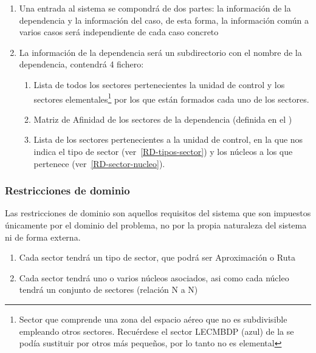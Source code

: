 \begin{enumerate}[label={\textbf{RIO\arabic*}}]
    \item  Una entrada al sistema se compondrá de dos partes: la información de la dependencia y la información del caso,
    de esta forma, la información común a varios casos será independiente de cada caso concreto
    \item La información de la dependencia será un subdirectorio con el nombre de la dependencia, contendrá 4 fichero:

    \begin{enumerate}[label*={\textbf{.\arabic*}}]
        \item  Lista de todos los sectores pertenecientes la unidad de control y los sectores elementales\footnote{
        Sector que comprende una zona del espacio aéreo que no es subdivisible empleando otros sectores. Recuérdese el sector LECMBDP (azul) de la  se podía sustituir por otros más pequeños, por lo tanto no es elemental
        } por los que están formados cada uno de los sectores.

        \item  Matriz de Afinidad de los sectores de la dependencia (definida en el )
        \item Lista de los sectores pertenecientes a la unidad de control, en la que nos indica el tipo de sector (ver~\ref{RD-tipos-sector}) y los núcleos a los que pertenece (ver~\ref{RD-sector-nucleo}).
    \end{enumerate}

\end{enumerate}


\subsubsection{Restricciones de dominio}
Las restricciones de dominio son aquellos requisitos del sistema que son impuestos únicamente por el dominio del problema, no por la propia naturaleza del sistema ni de forma externa.

\begin{enumerate}[label={\textbf{RD\arabic*}}]
    \item \label{RD-tipos-sector}  Cada sector tendrá un tipo de sector, que podrá ser Aproximación o Ruta
    \item  \label{RD-sector-nucleo} Cada sector tendrá uno o varios núcleos asociados, asi como cada núcleo tendrá un conjunto de sectores (relación N a N)

\end{enumerate}













